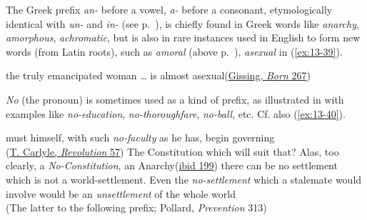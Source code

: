 \label{prefix_a}

The Greek prefix \textit{an-} before a vowel, \textit{a-} before a consonant, etymologically identical with \textit{un-} and \textit{in-} (see p.~\pageref{negative_un_in}), is chiefly found in Greek words like \textit{anarchy}, \textit{amorphous}, \textit{achromatic}, but is also in rare instances used in English to form new words (from Latin roots), such as \textit{amoral} (above p.~\pageref{amoral}), \textit{asexual} in (\ref{ex:13-39}).

\ea \label{ex:13-39} the truly emancipated woman {\dots} is almost asexual\hfill(\href{https://archive.org/details/borninexileanov02gissgoog/page/246/mode/2up?q=%22emancipated+woman%22&view=theater}{Gissing, \textit{Born} 267}) %
\z
{}


\textit{No} (the pronoun) is sometimes used as a kind of prefix, as illustrated in \citet[430 \S16.79]{jespersenMEG2} 
with examples like \textit{no-education}, \textit{no-thoroughfare}, \textit{no-ball}, etc. Cf. also (\ref{ex:13-40}).

\ea \label{ex:13-40}
\ea must himself, with such \emph{no-faculty} as he has, begin governing\\\hfill(\href{https://archive.org/details/gri_33125008092856/page/n67/mode/2up?q=%22such+no-faculty%22&view=theater}{T. Carlyle, \textit{Revolution} 57}) %
\ex The Constitution which will suit that? Alas, too clearly, a \emph{No-Constitution}, an Anarchy\hfill(\href{https://archive.org/details/gri_33125008092856/page/n185/mode/2up?q=%22constitution+which+will%22&view=theater}{ibid 199})
\ex there can be no settlement which is not a world-settlement. Even the \emph{no-settlement} which a stalemate would involve would be an \emph{unsettlement} of the whole world\\\hfill(The latter to the following prefix; Pollard, \textit{Prevention} 313)
\z
\z
{}

